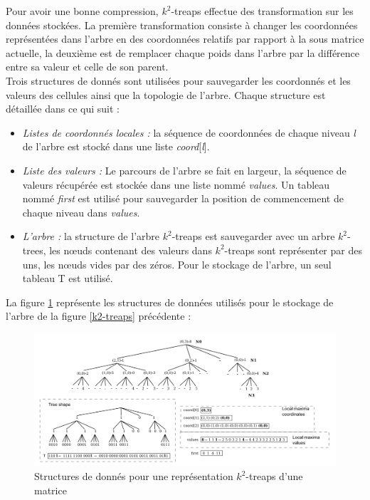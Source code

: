  Pour avoir une bonne compression, $k^2$-treaps effectue des transformation sur les données stockées. La première transformation consiste à changer les coordonnées  représentées dans l'arbre en des coordonnées relatifs par rapport à la sous matrice actuelle, la deuxième est de remplacer chaque poids dans l'arbre par la différence entre sa valeur et celle de son parent.\\
Trois structures de donnés sont utilisées pour sauvegarder les coordonnés et les valeurs des cellules ainsi que la topologie de l'arbre. Chaque structure est détaillée dans ce qui suit :
\begin{itemize}
\item \textit{Listes de coordonnés locales :} la séquence de coordonnées de chaque niveau \textit{l} de l'arbre est stocké dans une liste \textit{coord}[\textit{l}].
\item \textit{Liste des valeurs : } Le parcours de l'arbre se fait en largeur, la séquence de valeurs récupérée est stockée dans une liste nommé \textit{values}. Un tableau nommé \textit{first} est utilisé pour sauvegarder la position de commencement de chaque niveau dans \textit{values}.
\item \textit{L'arbre :} la structure de l'arbre $k^2$-treaps est sauvegarder avec un arbre $k^2$-trees, les nœuds contenant des valeurs dans $k^2$-treaps sont représenter par des uns, les nœuds vides par des zéros. Pour le stockage de l'arbre, un seul tableau T est utilisé. 
\end{itemize}

La figure \ref{k2-treaps-structure} représente les structures de données utilisés pour le stockage de l'arbre de la figure \ref{k2-treaps} précédente \citep{badr2013traitement} :

\begin{figure}[H]
\begin{center}
\includegraphics[height=200 pt, width=380 pt]{./ressources/image/k2-treaps-structure.png} 
\end{center}
\caption{Structures de donnés pour une représentation $k^2$-treaps d'une matrice}
\label{k2-treaps-structure}
\end{figure}

